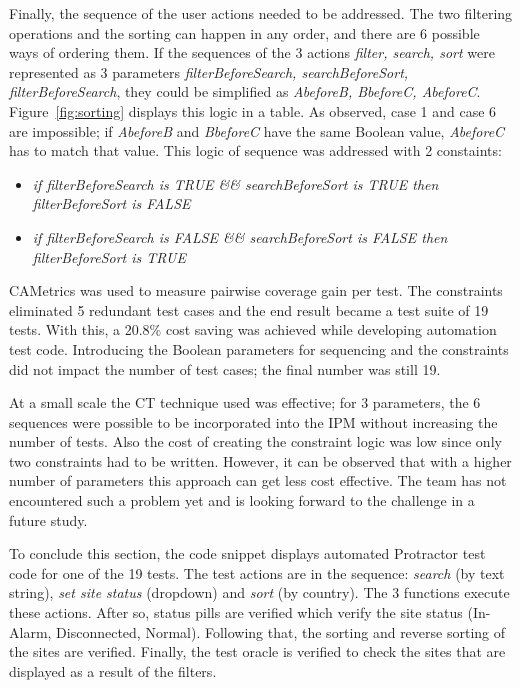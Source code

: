 \documentclass[conference]{IEEEtran}
\begin{document}
	Finally, the sequence of the user actions needed to be addressed. 
	The two filtering operations and the sorting can happen in any order, and there are 6 possible ways of ordering them.
	If the sequences of the 3 actions \textit{filter, search, sort} were represented as 3 parameters \textit{filterBeforeSearch, searchBeforeSort, filterBeforeSearch}, they could be simplified as \textit{AbeforeB, BbeforeC, AbeforeC}.
	Figure~\ref{fig:sorting} displays this logic in a table.
	As observed, case 1 and case 6 are impossible; if \textit{AbeforeB} and \textit{BbeforeC} have the same Boolean value, \textit{AbeforeC} has to match that value.
	This logic of sequence was addressed with 2 constaints:

	\begin{itemize}
	\item \textit{if filterBeforeSearch is TRUE \&\& searchBeforeSort is TRUE then filterBeforeSort is FALSE}
	\item \textit{if filterBeforeSearch is FALSE \&\& searchBeforeSort is FALSE then filterBeforeSort is TRUE}
	\end{itemize}

	CAMetrics was used to measure pairwise coverage gain per test. 
	The constraints eliminated 5 redundant test cases and the end result became a test suite of 19 tests. With this, a 20.8\% cost saving was achieved while developing automation test code.
	Introducing the Boolean parameters for sequencing and the constraints did not impact the number of test cases; the final number was still 19.

	At a small scale the CT technique used was effective; for 3 parameters, the 6 sequences were possible to be incorporated into the IPM without increasing the number of tests. 
	Also the cost of creating the constraint logic was low since only two constraints had to be written.
	However, it can be observed that with a higher number of parameters this approach can get less cost effective. 
	The team has not encountered such a problem yet and is looking forward to the challenge in a future study.
	
	To conclude this section, the code snippet displays automated Protractor test code for one of the 19 tests.
	The test actions are in the sequence: \textit{search} (by text string), \textit{set site status} (dropdown) and \textit{sort} (by country). 
	The 3 functions execute these actions.
	After so, status pills are verified which verify the site status (In-Alarm, Disconnected, Normal).
	Following that, the sorting and reverse sorting of the sites are verified.
	Finally, the test oracle is verified to check the sites that are displayed as a result of the filters.
\end{document}
